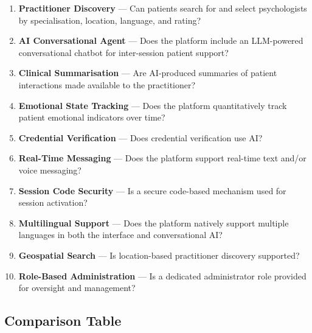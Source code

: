 \begin{enumerate}[label=\textbf{\arabic*.}, leftmargin=2em, itemsep=3pt]
  \item \textbf{Practitioner Discovery} — Can patients search for and select
        psychologists by specialisation, location, language, and rating?
  \item \textbf{AI Conversational Agent} — Does the platform include an
        LLM-powered conversational chatbot for inter-session patient support?
  \item \textbf{Clinical Summarisation} — Are AI-produced summaries of patient
        interactions made available to the practitioner?
  \item \textbf{Emotional State Tracking} — Does the platform quantitatively
        track patient emotional indicators over time?
  \item \textbf{Credential Verification} — Does credential verification use AI?
  \item \textbf{Real-Time Messaging} — Does the platform support real-time
        text and/or voice messaging?
  \item \textbf{Session Code Security} — Is a secure code-based mechanism used
        for session activation?
  \item \textbf{Multilingual Support} — Does the platform natively support
        multiple languages in both the interface and conversational AI?
  \item \textbf{Geospatial Search} — Is location-based practitioner discovery
        supported?
  \item \textbf{Role-Based Administration} — Is a dedicated administrator role
        provided for oversight and management?
\end{enumerate}

\subsection{Comparison Table}

\newcommand{\yes}{\textcolor{successgreen}{\faCheckCircle}}
\newcommand{\no}{\textcolor{warnorange}{\faTimesCircle}}
\newcommand{\partial}{\textcolor{accentblue}{\faAdjust}}

